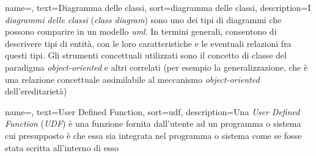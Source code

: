 {
    name=,
    text=Diagramma delle classi,
    sort=diagramma delle classi,
    description={I \textit{diagrammi delle classi} (\textit{class diagram}) sono uno dei tipi di diagrammi che possono comparire in un modello \textit{\gls{uml}}. In termini generali, consentono di descrivere tipi di entità, con le loro caratteristiche e le eventuali relazioni fra questi tipi. Gli strumenti concettuali utilizzati sono il concetto di classe del paradigma \textit{object-oriented} e altri correlati (per esempio la generalizzazione, che è una relazione concettuale assimilabile al meccanismo \textit{object-oriented} dell'ereditarietà)}
}

{
    name=,
    text=User Defined Function,
    sort=udf,
    description={Una \textit{User Defined Function} (\textit{UDF}) è una funzione fornita dall'utente ad un programma o sistema cui presupposto è che essa sia integrata nel programma o sistema come se fosse stata scritta all'interno di esso}
}
 




